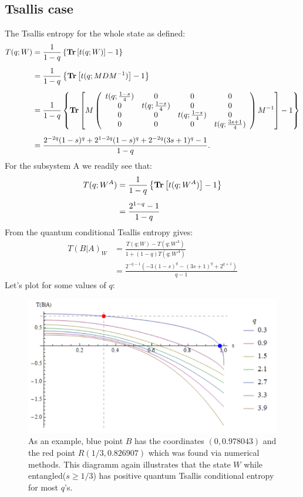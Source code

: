 \subsection{Tsallis case}
\noindent
The Tsallis entropy for the whole state as defined:
\begin{align}
T(q;W) &= \frac{1}{1-q} \left\{ \operatorname{\textup{\textbf{Tr}}} \left[ t(q;W) \right] -1   \right\} \nonumber \\[0.5em]
&= \frac{1}{1-q} \left\{ \operatorname{\textup{\textbf{Tr}}} \left[ t(q;MDM^{-1}) \right] -1   \right\} \nonumber \\[0.5em]
&=\frac{1}{1-q} \left\{ \operatorname{\textup{\textbf{Tr}}} \left[
M
\left( \begin{array}{cccc}
 t(q;\frac{1-s}{4}) & 0 & 0 & 0 \\
 0 & t(q;\frac{1-s}{4}) & 0 & 0 \\
 0 & 0 & t(q;\frac{1-s}{4}) & 0 \\
 0 & 0 & 0 & t(q;\frac{3s+1}{4}) \\
\end{array}
\right)
M^{-1}
\right]-1
\right\}
\nonumber\\[0.5em]
&=\frac{2^{-2 q} (1-s)^q+2^{1-2 q} (1-s)^q+2^{-2 q} (3 s+1)^q-1}{1-q}.
\end{align}
For the subsystem A we readily see that:
\begin{align}
T(q;W^A)&= \frac{1}{1-q} \left\{ \operatorname{\textup{\textbf{Tr}}} \left[ t(q;W^A) \right] -1   \right\} \nonumber \\[0.5em] &= \frac{2^{1-q}-1}{1-q}
\end{align}
From  the quantum conditional Tsallis entropy gives:
\begin{align}
T(B|A)_{W}&=\frac{T(q;W)-T(q;W^A)}{1+(1-q) T(q;W^A)}
\nonumber \\[0.5em] &= \frac{2^{-q-1} \left(-3 (1-s)^q-(3 s+1)^q+2^{q+1}\right)}{q-1}
\label{calccondtsa}
\end{align}
Let's plot for some values of $q$:
\begin{figure}[H]
\label{figure2}
\begin{center}
\includegraphics[scale=0.8]{figures/conditional_tsallis_werner.png}
\caption{As an example, blue point $B$ has the coordinates $(0,0.978043)$ and the red point $R(1/3,0.826907)$ which was found via numerical methods. This diagramm again illustrates that the state $W$ while entangled($s\geq 1/3 $) has positive quantum Tsallis conditional entropy for most $q$'s.}
\end{center}
\end{figure}
